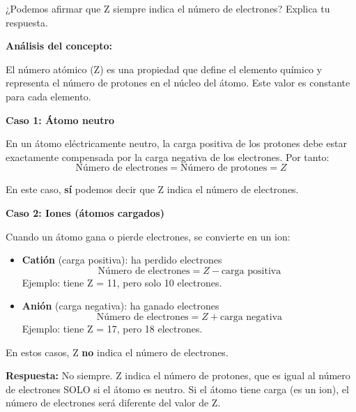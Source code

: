 \begin{exercise}
    ¿Podemos afirmar que Z siempre indica el número de electrones? Explica tu respuesta.
    \begin{solu}
        \textbf{Análisis del concepto:}

        El número atómico (Z) es una propiedad que define el elemento químico y representa el número de protones en el núcleo del átomo. Este valor es constante para cada elemento.

        \textbf{Caso 1: Átomo neutro}

        En un átomo eléctricamente neutro, la carga positiva de los protones debe estar exactamente compensada por la carga negativa de los electrones. Por tanto:
        \[
            \text{Número de electrones} = \text{Número de protones} = Z
        \]

        En este caso, \textbf{sí} podemos decir que Z indica el número de electrones.

        \textbf{Caso 2: Iones (átomos cargados)}

        Cuando un átomo gana o pierde electrones, se convierte en un ion:
        \begin{itemize}
            \item \textbf{Catión} (carga positiva): ha perdido electrones
            \[
                \text{Número de electrones} = Z - \text{carga positiva}
            \]
            Ejemplo:  tiene Z = 11, pero solo 10 electrones.

            \item \textbf{Anión} (carga negativa): ha ganado electrones
            \[
                \text{Número de electrones} = Z + \text{carga negativa}
            \]
            Ejemplo:  tiene Z = 17, pero 18 electrones.
        \end{itemize}

        En estos casos, Z \textbf{no} indica el número de electrones.

        \textbf{Respuesta:} No siempre. Z indica el número de protones, que es igual al número de electrones SOLO si el átomo es neutro. Si el átomo tiene carga (es un ion), el número de electrones será diferente del valor de Z.
    \end{solu}
\end{exercise}
